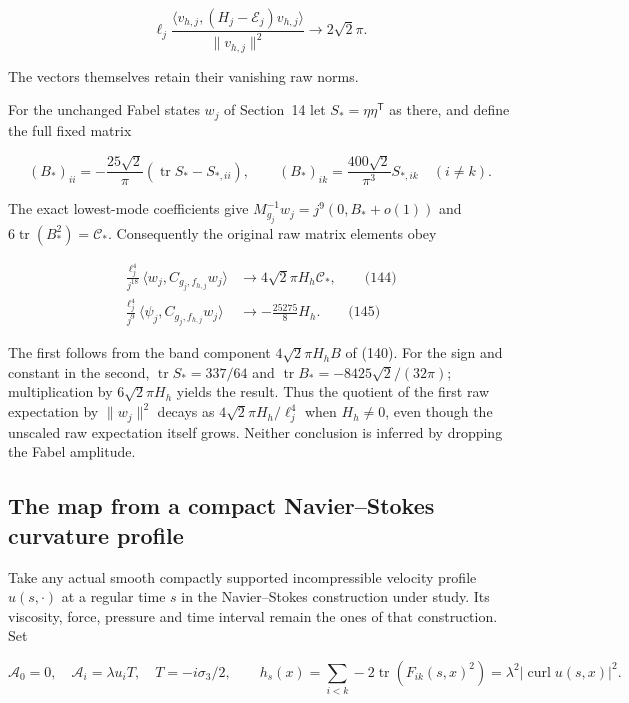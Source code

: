 \[
\ell_j\frac{\langle v_{h,j},(H_j-\mathcal E_j)v_{h,j}\rangle}
                   {\|v_{h,j}\|^2}\longrightarrow2\sqrt2\pi.
\]

The vectors themselves retain their vanishing raw norms.

For the unchanged Fabel states \(w_j\) of Section~14 let
\(S_*=\eta\eta^{\mathsf T}\) as there, and define the full fixed matrix

\[
(B_*)_{ii}=-\frac{25\sqrt2}{\pi}
                    (\operatorname{tr}S_*-S_{*,ii}),\qquad
 (B_*)_{ik}=\frac{400\sqrt2}{\pi^3}S_{*,ik}\quad(i\ne k).
\]

The exact lowest-mode coefficients give
\(M_{g_j}^{-1}w_j=j^9(0,B_*+o(1))\) and
\(6\operatorname{tr}(B_*^2)=\mathcal C_*\). Consequently the original
raw matrix elements obey

\[
\begin{aligned}
 \frac{\ell_j^4}{j^{18}}
 \langle w_j,C_{g_j,f_{h,j}}w_j\rangle
 &\longrightarrow4\sqrt2\pi H_h\mathcal C_*,
 \qquad\text{(144)}\\
 \frac{\ell_j^4}{j^9}
 \langle\psi_j,C_{g_j,f_{h,j}}w_j\rangle
 &\longrightarrow-\frac{25275}{8}H_h.
 \qquad\text{(145)}
\end{aligned}
\]

The first follows from the band component \(4\sqrt2\pi H_hB\) of (140).
For the sign and constant in the second, \(\operatorname{tr}S_*=337/64\)
and \(\operatorname{tr}B_*=-8425\sqrt2/(32\pi)\); multiplication by
\(6\sqrt2\pi H_h\) yields the result. Thus the quotient of the first raw
expectation by \(\|w_j\|^2\) decays as \(4\sqrt2\pi H_h/\ell_j^4\) when
\(H_h\ne0\), even though the unscaled raw expectation itself grows.
Neither conclusion is inferred by dropping the Fabel amplitude.

\subsection{The map from a compact Navier--Stokes curvature
profile}\label{local-energy-band-transfer-md-the-map-from-a-compact-navierstokes-curvature-profile}

Take any actual smooth compactly supported incompressible velocity
profile \(u(s,\cdot)\) at a regular time \(s\) in the Navier--Stokes
construction under study. Its viscosity, force, pressure and time
interval remain the ones of that construction. Set

\[
\mathcal A_0=0,\quad\mathcal A_i=\lambda u_iT,\quad
 T=-i\sigma_3/2,\qquad
 h_s(x)=\sum_{i<k}-2\operatorname{tr}(F_{ik}(s,x)^2)
                =\lambda^2|\operatorname{curl}u(s,x)|^2.
\]

